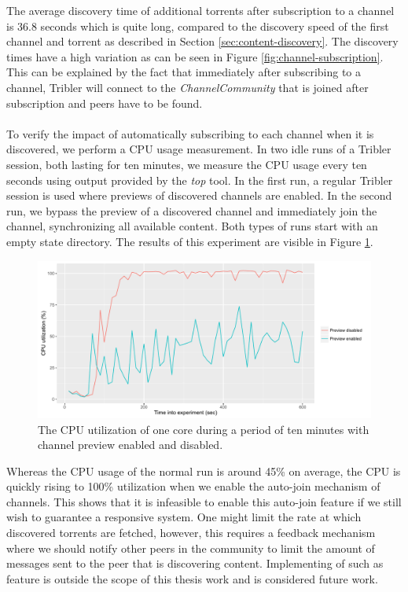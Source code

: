 The average discovery time of additional torrents after subscription to a channel is 36.8 seconds which is quite long, compared to the discovery speed of the first channel and torrent as described in Section \ref{sec:content-discovery}. The discovery times have a high variation as can be seen in Figure \ref{fig:channel-subscription}. This can be explained by the fact that immediately after subscribing to a channel, Tribler will connect to the \emph{ChannelCommunity} that is joined after subscription and peers have to be found.\\\\
To verify the impact of automatically subscribing to each channel when it is discovered, we perform a CPU usage measurement. In two idle runs of a Tribler session, both lasting for ten minutes, we measure the CPU usage every ten seconds using output provided by the \emph{top} tool. In the first run, a regular Tribler session is used where previews of discovered channels are enabled. In the second run, we bypass the preview of a discovered channel and immediately join the channel, synchronizing all available content. Both types of runs start with an empty state directory. The results of this experiment are visible in Figure \ref{fig:channel-subscription-cpu}.

\begin{figure}[!h]
	\centering
	\includegraphics[width=1.0\columnwidth]{images/experiments/subscribe_cpu_experiment}
	\caption{The CPU utilization of one core during a period of ten minutes with channel preview enabled and disabled.}
	\label{fig:channel-subscription-cpu}
\end{figure}

Whereas the CPU usage of the normal run is around 45\% on average, the CPU is quickly rising to 100\% utilization when we enable the auto-join mechanism of channels. This shows that it is infeasible to enable this auto-join feature if we still wish to guarantee a responsive system. One might limit the rate at which discovered torrents are fetched, however, this requires a feedback mechanism where we should notify other peers in the community to limit the amount of messages sent to the peer that is discovering content. Implementing of such as feature is outside the scope of this thesis work and is considered future work.

